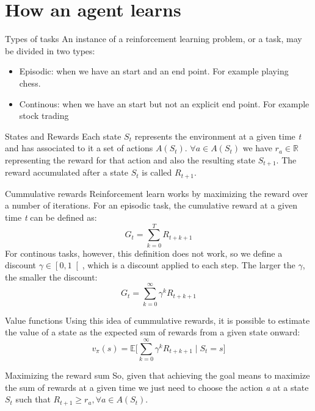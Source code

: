 \documentclass[10pt]{beamer}
\begin{document}
\section{How an agent learns}
\begin{frame}{Types of tasks}
    An instance of a reinforcement learning problem, or a task, may be divided in two types:
    \begin{itemize}
        \item Episodic: when we have an start and an end point. For example playing chess.
        \item Continous: when we have an start but not an explicit end point. For example stock trading
    \end{itemize}
\end{frame}
\begin{frame}{States and Rewards}
    Each state $S_t$ represents the environment at a given time \textit{t} and has associated to it a set of actions $A(S_t)$. $\forall a \in A(S_t)$ we have $r_a \in \mathbb{R}$ representing the reward for that action and also the resulting state $S_{t+1}$. The reward accumulated after a state $S_t$ is called $R_{t+1}$.
\end{frame}
\begin{frame}{Cummulative rewards}
    Reinforcement learn works by maximizing the reward over a number of iterations. 
    For an episodic task, the cumulative reward at a given time \textit{t} can be defined as:
    \[ G_t = \sum_{k=0}^{T} R_{t+k+1} \] 
    For continous tasks, however, this definition does not work, so we define a discount $\gamma \in \left[0,1\right[$, which is a discount applied to each step. The larger the $\gamma$, the smaller the discount:
    \[ G_t = \sum_{k=0}^{\infty} \gamma^k R_{t+k+1} \] 
\end{frame}
\begin{frame}{Value functions}
    Using this idea of cummulative rewards, it is possible to estimate the value of a state as the expected sum of rewards from a given state onward:
    \[ v_\pi (s) =  \mathbb{E} \Big[ \sum_{k=0}^{\infty} \gamma^k R_{t+k+1} \mid S_t=s \Big] \]
\end{frame}
\begin{frame}{Maximizing the reward sum}
    So, given that achieving the goal means to maximize the sum of rewards at a given time we just need to choose the action \textit{a} at a state $S_t$ such that $R_{t+1} \geqslant r_a, \forall a \in A(S_t)$.
\end{frame}
\end{document}
